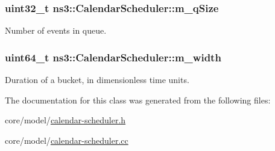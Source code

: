\subsubsection[{\texorpdfstring{m\+\_\+q\+Size}{m_qSize}}]{\setlength{\rightskip}{0pt plus 5cm}uint32\+\_\+t ns3\+::\+Calendar\+Scheduler\+::m\+\_\+q\+Size\hspace{0.3cm}{\ttfamily [private]}}\hypertarget{classns3_1_1CalendarScheduler_a24148e8feac3c068ab31317aee8f46c2}{}\label{classns3_1_1CalendarScheduler_a24148e8feac3c068ab31317aee8f46c2}
Number of events in queue. 
\subsubsection[{\texorpdfstring{m\+\_\+width}{m_width}}]{\setlength{\rightskip}{0pt plus 5cm}uint64\+\_\+t ns3\+::\+Calendar\+Scheduler\+::m\+\_\+width\hspace{0.3cm}{\ttfamily [private]}}\hypertarget{classns3_1_1CalendarScheduler_acbe04fc4f382aa5759beb2dc1cdc0523}{}\label{classns3_1_1CalendarScheduler_acbe04fc4f382aa5759beb2dc1cdc0523}
Duration of a bucket, in dimensionless time units. 

The documentation for this class was generated from the following files\+:\begin{DoxyCompactItemize}
\item 
core/model/\hyperlink{calendar-scheduler_8h}{calendar-\/scheduler.\+h}\item 
core/model/\hyperlink{calendar-scheduler_8cc}{calendar-\/scheduler.\+cc}\end{DoxyCompactItemize}
